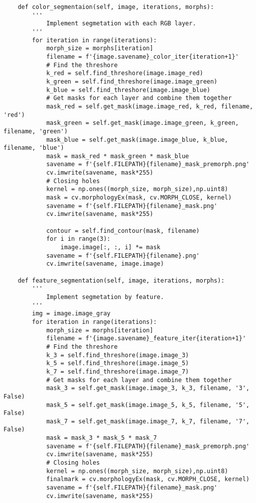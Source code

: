 \documentclass[11pt]{article}
\begin{document}
\begin{lstlisting}
    def color_segmentaion(self, image, iterations, morphs):
        '''
            Implement segmetation with each RGB layer.
        '''
        for iteration in range(iterations):
            morph_size = morphs[iteration]
            filename = f'{image.savename}_color_iter{iteration+1}'
            # Find the threshore
            k_red = self.find_threshore(image.image_red)
            k_green = self.find_threshore(image.image_green)
            k_blue = self.find_threshore(image.image_blue)
            # Get masks for each layer and combine them together
            mask_red = self.get_mask(image.image_red, k_red, filename, 'red')
            mask_green = self.get_mask(image.image_green, k_green, filename, 'green')
            mask_blue = self.get_mask(image.image_blue, k_blue, filename, 'blue')
            mask = mask_red * mask_green * mask_blue
            savename = f'{self.FILEPATH}{filename}_mask_premorph.png'
            cv.imwrite(savename, mask*255)
            # Closing holes
            kernel = np.ones((morph_size, morph_size),np.uint8)
            mask = cv.morphologyEx(mask, cv.MORPH_CLOSE, kernel)
            savename = f'{self.FILEPATH}{filename}_mask.png'
            cv.imwrite(savename, mask*255)

            contour = self.find_contour(mask, filename)
            for i in range(3):
                image.image[:, :, i] *= mask
            savename = f'{self.FILEPATH}{filename}.png'
            cv.imwrite(savename, image.image)
    
    def feature_segmentation(self, image, iterations, morphs):
        '''
            Implement segmetation by feature.
        '''
        img = image.image_gray
        for iteration in range(iterations):
            morph_size = morphs[iteration]
            filename = f'{image.savename}_feature_iter{iteration+1}'
            # Find the threshore
            k_3 = self.find_threshore(image.image_3)
            k_5 = self.find_threshore(image.image_5)
            k_7 = self.find_threshore(image.image_7)
            # Get masks for each layer and combine them together
            mask_3 = self.get_mask(image.image_3, k_3, filename, '3', False)
            mask_5 = self.get_mask(image.image_5, k_5, filename, '5', False)
            mask_7 = self.get_mask(image.image_7, k_7, filename, '7', False)
            mask = mask_3 * mask_5 * mask_7
            savename = f'{self.FILEPATH}{filename}_mask_premorph.png'
            cv.imwrite(savename, mask*255)
            # Closing holes
            kernel = np.ones((morph_size, morph_size),np.uint8)
            finalmark = cv.morphologyEx(mask, cv.MORPH_CLOSE, kernel)
            savename = f'{self.FILEPATH}{filename}_mask.png'
            cv.imwrite(savename, mask*255)


\end{lstlisting}
\end{document}
